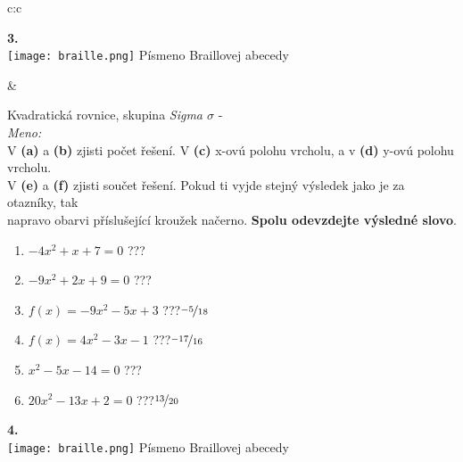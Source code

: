 \documentclass[10pt]{report}
\begin{document}
\begin{tabular}{c:c}
\begin{minipage}[c][99mm][t]{0.49\linewidth}
\begin{center}
\begin{minipage}{0.20\linewidth}
\begin{center}
{\Huge\bfseries 3.} \\[2mm]
\texttt{[image: braille.png]}
{\small Písmeno Braillovej abecedy}
\end{center}
\end{minipage}
\end{center}
\end{minipage}
&
\begin{minipage}[c][99mm][t]{0.49\linewidth}
\begin{center}
\vspace{7mm}
{\huge Kvadratická rovnice, skupina \textit{Sigma $\sigma$} -}\\[4.5mm]
\textit{Meno:}\phantom{xxxxxxxxxxxxxxxxxxxxxxxxxxxxxxxxxxxxxxxxxxxxxxxxxxxxxxxxxxxxxxxxx}\\[3.5mm]
V \textbf{(a)} a \textbf{(b)} zjisti počet řešení. V \textbf{(c)} x-ovú polohu vrcholu, a v \textbf{(d)} y-ovú polohu vrcholu.\\V \textbf{(e)} a \textbf{(f)} zjisti součet řešení. Pokud ti vyjde stejný výsledek jako je za otazníky, tak\\napravo obarvi příslušející kroužek načerno. \textbf{Spolu odevzdejte výsledné slovo}.\\[3mm]
\begin{minipage}{0.77\linewidth}
\begin{center}
\begin{varwidth}{\textwidth}
\begin{enumerate}
\large
\item $-4x^2+x+7=0$\quad \dotfill\; ???\;\dotfill {}
\item $-9x^2+2x+9=0$\quad \dotfill\; ???\;\dotfill {}
\item $f(x)=-9x^2-5x+3$\quad \dotfill\; ???\;\dotfill \quad $\nicefrac{-5}{18}$
\item $f(x)=4x^2-3x-1$\quad \dotfill\; ???\;\dotfill \quad $\nicefrac{-17}{16}$
\item $x^2-5x-14=0$\quad \dotfill\; ???\;\dotfill {}
\item $20x^2-13x+2=0$\quad \dotfill\; ???\;\dotfill \quad $\nicefrac{13}{20}$
\end{enumerate}
\end{varwidth}
\end{center}
\end{minipage}
\begin{minipage}{0.20\linewidth}
\begin{center}
{\Huge\bfseries 4.} \\[2mm]
\texttt{[image: braille.png]}
{\small Písmeno Braillovej abecedy}
\end{center}
\end{minipage}
\end{center}
\end{minipage}

\end{tabular}
\end{document}
